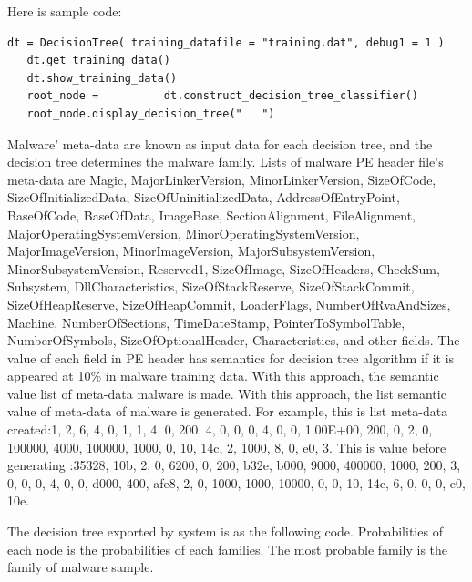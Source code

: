 Here is sample code:
\begin{lstlisting}[caption=Python Implementation of Decision tree 1.5, label=meinLabel]
  dt = DecisionTree( training_datafile = "training.dat", debug1 = 1 )
   dt.get_training_data()
   dt.show_training_data()
   root_node = 		    dt.construct_decision_tree_classifier()
   root_node.display_decision_tree("   ")
\end{lstlisting}

 
Malware' meta-data are known as input data for each decision tree, and the decision tree determines the malware family. Lists of malware PE header file's meta-data are Magic, MajorLinkerVersion, MinorLinkerVersion, SizeOfCode, SizeOfInitializedData, SizeOfUninitializedData, AddressOfEntryPoint, BaseOfCode, BaseOfData, ImageBase, SectionAlignment, FileAlignment, MajorOperatingSystemVersion, MinorOperatingSystemVersion, MajorImageVersion, MinorImageVersion, MajorSubsystemVersion, MinorSubsystemVersion, Reserved1, SizeOfImage, SizeOfHeaders, CheckSum, Subsystem, DllCharacteristics, SizeOfStackReserve, SizeOfStackCommit, SizeOfHeapReserve, SizeOfHeapCommit, LoaderFlags, NumberOfRvaAndSizes, Machine, NumberOfSections, TimeDateStamp, PointerToSymbolTable, NumberOfSymbols, SizeOfOptionalHeader, Characteristics, and other fields. The value of each field in PE header has semantics for decision tree algorithm if it is appeared at 10\% in malware training data. With this approach, the semantic value list of meta-data malware is made. With this approach, the list semantic value of meta-data of malware is generated. For example, this is list meta-data created:1, 2, 6, 4, 0, 1, 1, 4, 0, 200, 4, 0, 0, 0, 4, 0, 0, 1.00E+00, 200, 0, 2, 0, 100000, 4000, 100000, 1000, 0, 10, 14c, 2, 1000, 8, 0, e0, 3. This is value before generating :35328, 10b, 2, 0, 6200, 0, 200, b32e, b000, 9000, 400000, 1000, 200, 3, 0, 0, 0, 4, 0, 0, d000, 400, afe8, 2, 0, 1000, 1000, 10000, 0, 0, 10, 14c, 6, 0, 0, 0, e0, 10e.
 
The decision tree exported by system is as the following code. Probabilities of each node is the probabilities of each families. The most probable family is the family of malware sample.

